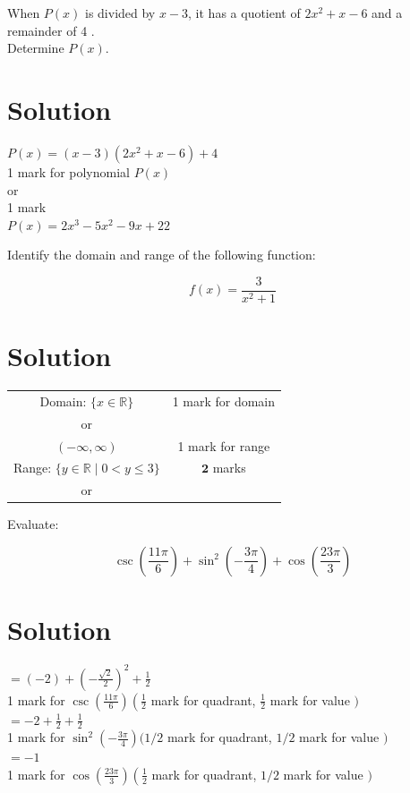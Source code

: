 \documentclass[10pt]{article}
\begin{document}
When $P(x)$ is divided by $x-3$, it has a quotient of $2 x^{2}+x-6$ and a remainder of 4 .\\
Determine $P(x)$.

\section*{Solution}
$P(x)=(x-3)\left(2 x^{2}+x-6\right)+4$\\
1 mark for polynomial $P(x)$\\
or\\
1 mark\\
$P(x)=2 x^{3}-5 x^{2}-9 x+22$

Identify the domain and range of the following function:

$$
f(x)=\frac{3}{x^{2}+1}
$$

\section*{Solution}
\begin{center}
\begin{tabular}{cc}
Domain: $\{x \in \mathbb{R}\}$ & 1 mark for domain \\
or &  \\
$(-\infty, \infty)$ & 1 mark for range \\
Range: $\{y \in \mathbb{R} \mid 0<y \leq 3\}$ & $\mathbf{2}$ marks \\
or &  \\
\end{tabular}
\end{center}

Evaluate:

$$
\csc \left(\frac{11 \pi}{6}\right)+\sin ^{2}\left(-\frac{3 \pi}{4}\right)+\cos \left(\frac{23 \pi}{3}\right)
$$

\section*{Solution}
$=(-2)+\left(-\frac{\sqrt{2}}{2}\right)^{2}+\frac{1}{2}$\\
1 mark for $\csc \left(\frac{11 \pi}{6}\right)\left(\frac{1}{2}\right.$ mark for quadrant, $\frac{1}{2}$ mark for value $)$\\
$=-2+\frac{1}{2}+\frac{1}{2}$\\
1 mark for $\sin ^{2}\left(-\frac{3 \pi}{4}\right)(1 / 2$ mark for quadrant, $1 / 2$ mark for value $)$\\
$=-1$\\
1 mark for $\cos \left(\frac{23 \pi}{3}\right)\left(\frac{1}{2}\right.$ mark for quadrant, $1 / 2$ mark for value $)$
\end{document}
